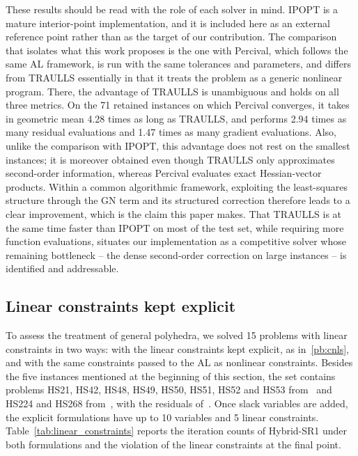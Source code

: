 \documentclass[pdflatex,sn-mathphys-num]{sn-jnl}%
\theoremstyle{thmstyleone}%
\begin{document}
These results should be read with the role of each solver in mind. IPOPT is a mature interior-point implementation, and it is included here as an external reference point rather than as the target of our contribution. The comparison that isolates what this work proposes is the one with Percival, which follows the same AL framework, is run with the same tolerances and parameters, and differs from TRAULLS essentially in that it treats the problem as a generic nonlinear program. There, the advantage of TRAULLS is unambiguous and holds on all three metrics. On the 71 retained instances on which Percival converges, it takes in geometric mean 4.28 times as long as TRAULLS, and performs 2.94 times as many residual evaluations and 1.47 times as many gradient evaluations. Also, unlike the comparison with IPOPT, this advantage does not rest on the smallest instances; it is moreover obtained even though TRAULLS only approximates second-order information, whereas Percival evaluates exact Hessian-vector products. Within a common algorithmic framework, exploiting the least-squares structure through the GN term and its structured correction therefore leads to a clear improvement, which is the claim this paper makes. That TRAULLS is at the same time faster than IPOPT on most of the test set, while requiring more function evaluations, situates our implementation as a competitive solver whose remaining bottleneck -- the dense second-order correction on large instances -- is identified and addressable.

\subsection{Linear constraints kept explicit}\label{subsec:linear_constraints}

To assess the treatment of general polyhedra, we solved 15 problems with linear constraints in two ways: with the linear constraints kept explicit, as in~\eqref{pb:cnls}, and with the same constraints passed to the AL as nonlinear constraints. Besides the five instances mentioned at the beginning of this section, the set contains problems HS21, HS42, HS48, HS49, HS50, HS51, HS52 and HS53 from~\cite{hockschittkowski:1980} and HS224 and HS268 from~\cite{schittkowski:1987}, with the residuals of~\cite{nls-problems-julia}. Once slack variables are added, the explicit formulations have up to 10 variables and 5 linear constraints. Table~\ref{tab:linear_constraints} reports the iteration counts of Hybrid-SR1 under both formulations and the violation of the linear constraints at the final point.
\end{document}
